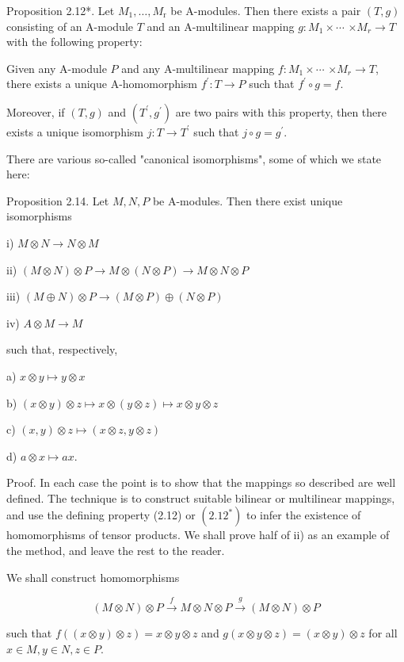 \documentclass{standalone}
\theoremstyle{definition}
\theoremstyle{remark}
\begin{document}
Proposition 2.12*. Let $M_{1}, \ldots, M_{\mathrm{r}}$ be A-modules. Then there exists a pair $(T, g)$ consisting of an A-module $T$ and an A-multilinear mapping $g: M_{1} \times \cdots$ $\times M_{r} \rightarrow T$ with the following property:

Given any A-module $P$ and any A-multilinear mapping $f: M_{1} \times \cdots$ $\times M_{r} \rightarrow T$, there exists a unique A-homomorphism $f^{\prime}: T \rightarrow P$ such that $f^{\prime} \circ g=f$.

Moreover, if $(T, g)$ and $\left(T^{\prime}, g^{\prime}\right)$ are two pairs with this property, then there exists a unique isomorphism $j: T \rightarrow T^{\prime}$ such that $j \circ g=g^{\prime}$.

There are various so-called "canonical isomorphisms", some of which we state here:

Proposition 2.14. Let $M, N, P$ be A-modules. Then there exist unique isomorphisms

i) $M \otimes N \rightarrow N \otimes M$

ii) $(M \otimes N) \otimes P \rightarrow M \otimes(N \otimes P) \rightarrow M \otimes N \otimes P$

iii) $(M \oplus N) \otimes P \rightarrow(M \otimes P) \oplus(N \otimes P)$

iv) $A \otimes M \rightarrow M$

such that, respectively,

a) $x \otimes y \mapsto y \otimes x$

b) $(x \otimes y) \otimes z \mapsto x \otimes(y \otimes z) \mapsto x \otimes y \otimes z$

c) $(x, y) \otimes z \mapsto(x \otimes z, y \otimes z)$

d) $a \otimes x \mapsto a x$.

Proof. In each case the point is to show that the mappings so described are well defined. The technique is to construct suitable bilinear or multilinear mappings, and use the defining property (2.12) or $\left(2.12^{*}\right)$ to infer the existence of homomorphisms of tensor products. We shall prove half of ii) as an example of the method, and leave the rest to the reader.

We shall construct homomorphisms

\[
(M \otimes N) \otimes P \stackrel{f}{\rightarrow} M \otimes N \otimes P \stackrel{g}{\rightarrow}(M \otimes N) \otimes P
\]

such that $f((x \otimes y) \otimes z)=x \otimes y \otimes z$ and $g(x \otimes y \otimes z)=(x \otimes y) \otimes z$ for all $x \in M, y \in N, z \in P$.
\end{document}
